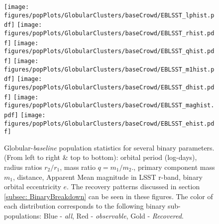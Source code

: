 \documentclass[twocolumn]{aastex63}
\begin{document}
\begin{figure*}[p]
    \centering
    \texttt{[image: figures/popPlots/GlobularClusters/baseCrowd/EBLSST\_lphist.pdf]}
    \texttt{[image: figures/popPlots/GlobularClusters/baseCrowd/EBLSST\_rhist.pdf]} 
    \texttt{[image: figures/popPlots/GlobularClusters/baseCrowd/EBLSST\_qhist.pdf]} 
    \texttt{[image: figures/popPlots/GlobularClusters/baseCrowd/EBLSST\_m1hist.pdf]} 
    \texttt{[image: figures/popPlots/GlobularClusters/baseCrowd/EBLSST\_dhist.pdf]}
    \texttt{[image: figures/popPlots/GlobularClusters/baseCrowd/EBLSST\_maghist.pdf]} 
    \texttt{[image: figures/popPlots/GlobularClusters/baseCrowd/EBLSST\_ehist.pdf]} 
    \caption{Globular-\textit{baseline} population statistics for several binary parameters. (From left to right \& top to bottom): orbital period (log-days), radius ratios $r_2/r_1$,  mass ratio $q = m_1/m_2$., primary component mass $m_1$,  distance, Apparent Mean magnitude in LSST r-band, binary orbital eccentricity $e$. The recovery patterns discussed in section \ref{subsec: BinaryBreakdown} can be seen in these figures. The color of each distribution corresponds to the following binary sub-populations: Blue - \textit{all}, Red - \textit{observable}, Gold - \textit{Recovered}.}
    \label{fig:gbc-hists}
\end{figure*}
\end{document}
